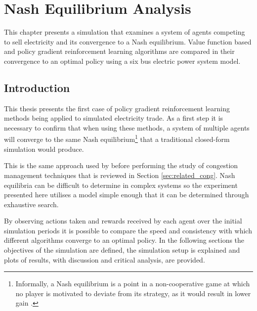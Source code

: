 \chapter{Nash Equilibrium Analysis}
\label{ch:nashanalysis}
This chapter presents a simulation that examines a system of agents competing to
sell electricity and its convergence to a Nash equilibrium.  Value function
based and policy gradient reinforcement learning algorithms are compared in
their convergence to an optimal policy using a six bus electric power system
model.

\section{Introduction}
This thesis presents the first case of policy gradient reinforcement learning
methods being applied to simulated electricity trade.  As a first step it is
necessary to confirm that when using these methods, a system of multiple agents
will converge to the same Nash equilibrium\footnote{Informally, a Nash
equilibrium is a point in a non-cooperative game at which no player is
motivated to deviate from its strategy, as it would result in lower gain
\cite{nash50,nash51}.} that a traditional closed-form simulation would produce.

This is the same approach used by  before performing the
study of congestion management techniques that is reviewed in Section
\ref{sec:related_cong}.  Nash equilibria can be difficult
to determine in complex systems so the experiment presented here utilises a
model simple enough that it can be determined through exhaustive search.

By observing actions taken and rewards received by each agent over the
initial simulation periods it is possible to compare the speed and consistency
with which different algorithms converge to an optimal policy. In the following
sections the objectives of the simulation are defined, the simulation setup
is explained and plots of results, with discussion and critical analysis, are
provided.

